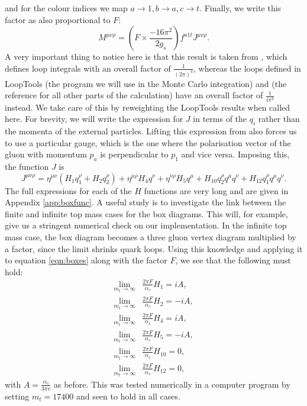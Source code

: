and for the colour indices we map $a \to 1, b \to a, c\to t$. Finally, we write this factor as also proportional to $F$:
\begin{equation}
M^{\mu \nu \rho} = \left(F \times \frac{-16 \pi^2}{2 g_s} \right) f^{a1t}J^{\mu \nu \rho}.
\end{equation}
A very important thing to notice here is that this result is taken from \cite{Duca2003}, which defines loop integrals with an overall factor of $\frac{1}{(2 \pi)^4}$, whereas the loops defined in LoopTools \cite{Hahn1999} (the program we will use in the Monte Carlo integration) and \cite{DelDuca2001} (the reference for all other parts of the calculation) have an overall factor of $\frac{1}{i \pi^2}$ instead. We take care of this by reweighting the LoopTools results when called here. For brevity, we will write the expression for $J$ in terms of the $q_i$ rather than the momenta of the external particles. Lifting this expression from \cite{Duca2003} also forces us to use a particular gauge, which is the one where the polarisation vector of the gluon with momentum $p_a$ is perpendicular to $p_1$ and vice versa. Imposing this, the function $J$ is %
\begin{equation}
J^{\mu \nu \rho} = \eta^{\mu \nu}(H_1 q_1^\rho + H_2 q_2^\rho) + \eta^{\mu \rho}H_4 q^\nu + \eta^{\nu \rho}H_5 q^\mu + H_{10} q_2^\rho q^\mu q^\nu + H_{12} q_1^\rho q^\mu q^\nu.
\label{eqn:boxes}
\end{equation}
The full expressions for each of the $H$ functions are very long and are given in Appendix \ref{app:boxfunc}. A useful study is to investigate the link between the finite and infinite top mass cases for the box diagrams. This will, for example, give us a stringent numerical check on our implementation. In the infinite top mass case, the box diagram becomes a three gluon vertex diagram multiplied by a factor, since the limit shrinks quark loops. Using this knowledge and applying it to equation \ref{eqn:boxes} along with the factor $F$, we see that the following must hold: 
\begin{equation}
\begin{split}
\lim_{m_t \to \infty} & \frac{2 \pi F}{\alpha_s} H_1 = i A, \\
\lim_{m_t \to \infty} & \frac{2 \pi F}{\alpha_s} H_2 = -i A, \\
\lim_{m_t \to \infty} & \frac{2 \pi F}{\alpha_s} H_4 = i A, \\
\lim_{m_t \to \infty} & \frac{2 \pi F}{\alpha_s} H_5 = -i A, \\
\lim_{m_t \to \infty} & \frac{2 \pi F}{\alpha_s} H_{10} = 0, \\
\lim_{m_t \to \infty} & \frac{2 \pi F}{\alpha_s} H_{12} = 0,
\end{split}
\end{equation}
with $A = \frac{\alpha_s}{3 \pi v}$ as before. This was tested numerically in a computer program by setting $m_t = 17400$ and seen to hold in all cases. %

